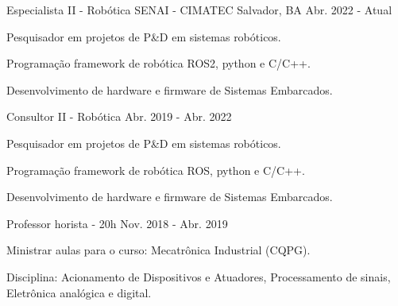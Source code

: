 

\begin{cventries}

  \cventry
    {Especialista II - Robótica} %
    {SENAI - CIMATEC} %
    {Salvador, BA} %
    {Abr. 2022 - Atual} %
    {
      \begin{cvitems} %
        \item {Pesquisador em projetos de P\&D em sistemas robóticos.}
        \item {Programação framework de robótica ROS2, python e C/C++.}
        \item {Desenvolvimento de hardware e firmware de Sistemas Embarcados.}
      \end{cvitems}
    }

\cventry    
    {Consultor II - Robótica} %
    {} %
    {} %
    {Abr. 2019 - Abr. 2022} %
    {
      \begin{cvitems} %
        \item {Pesquisador em projetos de P\&D em sistemas robóticos.}
        \item {Programação framework de robótica ROS, python e C/C++.}
        \item {Desenvolvimento de hardware e firmware de Sistemas Embarcados.}
      \end{cvitems}
    }

  \cventry
    {Professor horista - 20h} %
    {} %
    {} %
    {Nov. 2018 - Abr. 2019} %
    {
      \begin{cvitems} %
        \item {Ministrar aulas para o curso: Mecatrônica Industrial (CQPG).}
        \item {Disciplina: Acionamento de Dispositivos e Atuadores, Processamento de sinais, Eletrônica analógica e digital.}
      \end{cvitems}
    }


\end{cventries}
